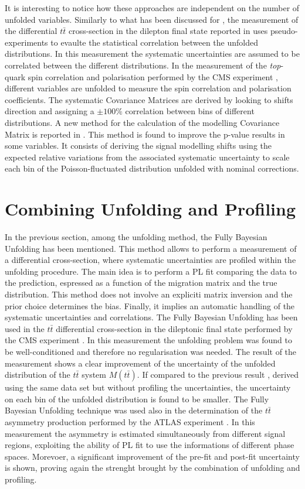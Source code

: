 \documentclass[12pt]{article}
\begin{document}
It is interesting to notice how these approaches are independent on the number of unfolded variables.
Similarly to what has been discussed for \cite{atlas_diffrential}, the measurement of the differential $t\bar{t}$ cross-section in the dilepton final state reported in \cite{atlas_diff_dilep} uses pseudo-experiments to evaulte the statistical correlation between the unfolded distributions. In this measurement the systematic uncertainties are assumed to be correlated between the different distributions. 
In the measurement of the \emph{top}-quark spin correlation and polarisation performed by the CMS experiment \cite{PhysRevD.100.072002}, different variables are unfolded to measure the spin correlation and polarisation coefficients. The systematic Covariance Matrices are derived by looking to shifts direction and assigning a $\pm100\%$ correlation between bins of different distributions.
A new method for the calculation of the modelling Covariance Matrix is reported in \cite{allhad_atlas}. This method is found to improve the p-value results in some variables. It consists of deriving the signal modelling shifts using the expected relative variations from the associated systematic uncertainty to scale each bin of the Poisson-fluctuated distribution unfolded with nominal corrections.

\section{Combining Unfolding and Profiling}
In the previous section, among the unfolding method, the Fully Bayesian Unfolding \cite{choudalakis2012fully} has been mentioned. This method allows to perform a measurement of a differential cross-section, where systematic uncertainties are profiled within the unfolding procedure. 
The main idea is to perform a PL fit comparing the data to the prediction, espressed as a function of the migration matrix and the true distribution. This method does not involve an expliciti matrix inversion and the prior choice determines the bias. Finally, it implies an automatic handling of the systematic uncertainties and correlations.
The Fully Bayesian Unfolding has been used in the $t\bar{t}$ differential cross-section in the dileptonic final state performed by the CMS experiment \cite{2020135263}. In this measurement the unfolding problem was found to be well-conditioned and therefore no regularisation was needed. 
The result of the measurement shows a clear improvement of the uncertainty of the unfolded distribution of the $t\bar{t}$ system $M(t\bar{t})$. If compared to the previous result \cite{CMS_diff_to_compare}, derived using the same data set but without profiling the uncertainties, the uncertainty on each bin of the unfolded distribution is found to be smaller.
The Fully Bayesian Unfolding technique was used also in the determination of the $t\bar{t}$ asymmetry production performed by the ATLAS experiment \cite{ATLAS-CONF-2019-026}. In this measurement the asymmetry is estimated simultaneously from different signal regions, exploiting the ability of PL fit to use the informations of different phase spaces. Morevoer, a significant improvement of the pre-fit and post-fit uncertainty is shown, proving again the strenght brought by the combination of unfolding and profiling. 
\end{document}
